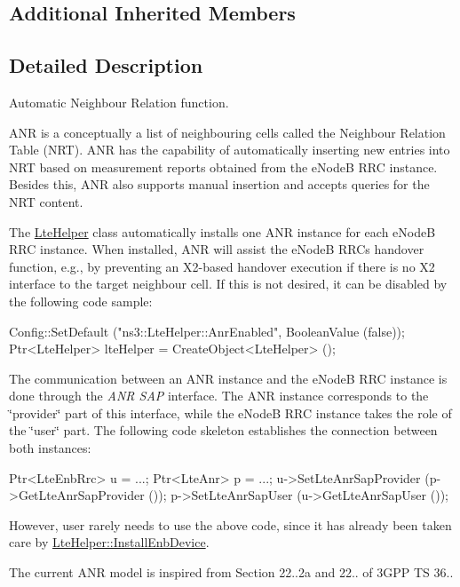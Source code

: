 \subsection*{Additional Inherited Members}


\subsection{Detailed Description}
Automatic Neighbour Relation function. 

A\+NR is a conceptually a list of neighbouring cells called the Neighbour Relation Table (N\+RT). A\+NR has the capability of automatically inserting new entries into N\+RT based on measurement reports obtained from the e\+NodeB R\+RC instance. Besides this, A\+NR also supports manual insertion and accepts queries for the N\+RT content.

The \hyperlink{classns3_1_1LteHelper}{Lte\+Helper} class automatically installs one A\+NR instance for each e\+NodeB R\+RC instance. When installed, A\+NR will assist the e\+NodeB R\+RC\textquotesingle{}s handover function, e.\+g., by preventing an X2-\/based handover execution if there is no X2 interface to the target neighbour cell. If this is not desired, it can be disabled by the following code sample\+: \begin{DoxyVerb}Config::SetDefault ("ns3::LteHelper::AnrEnabled", BooleanValue (false));
Ptr<LteHelper> lteHelper = CreateObject<LteHelper> ();
\end{DoxyVerb}


The communication between an A\+NR instance and the e\+NodeB R\+RC instance is done through the {\itshape A\+NR S\+AP} interface. The A\+NR instance corresponds to the \char`\"{}provider\char`\"{} part of this interface, while the e\+NodeB R\+RC instance takes the role of the \char`\"{}user\char`\"{} part. The following code skeleton establishes the connection between both instances\+: \begin{DoxyVerb}Ptr<LteEnbRrc> u = ...;
Ptr<LteAnr> p = ...;
u->SetLteAnrSapProvider (p->GetLteAnrSapProvider ());
p->SetLteAnrSapUser (u->GetLteAnrSapUser ());
\end{DoxyVerb}


However, user rarely needs to use the above code, since it has already been taken care by \hyperlink{classns3_1_1LteHelper_a5e009ad35ef85f46b5a6099263f15a03}{Lte\+Helper\+::\+Install\+Enb\+Device}.

The current A\+NR model is inspired from Section 22..\+2a and 22.. of 3\+G\+PP TS 36..

